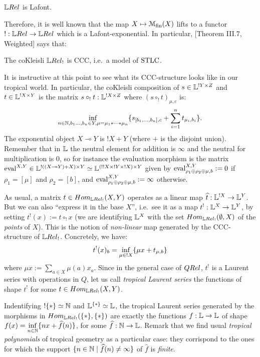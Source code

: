 \begin{fact}
 $\LREL$ is Lafont.
\end{fact}

Therefore, it is well known that the map $X\mapsto \mathcal{M}_{\mathrm{fin}}(X)$ lifts to a functor $!:\LREL\to\LREL$ which %
is a Lafont-exponential.
In particular, [Theorem III.7, Weighted] says that:
\begin{fact}
 The coKleisli $\LREL_!$ is CCC, i.e.\ a model of $\mathrm{STLC}$.
\end{fact}

It is instructive at this point to see what its CCC-structure looks like in our tropical world.
In particular, the coKleisli composition of $s\in\mathbb{L}^{!Y\times Z}$ and $t\in\mathbb{L}^{!X\times Y}$ is the matrix $s\circ_! t:\mathbb{L}^{!X\times Z}$ where $(s\circ_! t)_{\mu,c}$ is:
\[
 \inf\limits_{n\in\mathbb{N}, b_1\dots,b_n\in Y, \mu = \mu_1*\cdots *\mu_n}
 \{s_{[b_1,\dots,b_n],c} + \sum\limits_{i=1}^n t_{\mu_i,b_i}\}.
\]
The exponential object $X\multimap Y$ is $!X+Y$ (where $+$ is the disjoint union).
Remember that in $\mathbb{L}$ the neutral element for addition is $\infty$ and the neutral for multiplication is $0$, so for instance the evaluation morphism is the matrix $\mathrm{eval}^{X,Y}\in\mathbb{L}^{!((X\multimap Y) + X)\times Y}\simeq\mathbb{L}^{(!!X\times !Y\times !X)\times Y}$ given by $\mathrm{eval}^{X,Y}_{\rho_1\oplus\rho_2\oplus\mu,b}:=0$ if $\rho_1=[\mu]$ and $\rho_2=[b]$, and $\mathrm{eval}^{X,Y}_{\rho_1\oplus\rho_2\oplus\mu,b}:=\infty$ otherwise.

\begin{remark}
 As usual, a matrix $t\in\HOM{\LREL_!}{X}{Y}$ operates as a linear map $\widehat t:\mathbb{L}^{!X}\to\mathbb{L}^Y$.
 But we can also ``express it in the base $X$'', i.e.\ see it as a map $t^!:\mathbb{L}^X\to\mathbb{L}^Y$, by setting $t^!(x):=t\circ_! x$ (we are identifying $\mathbb{L}^X$ with the set $\HOM{\LREL_!}{\emptyset}{X}$ of the \emph{points} of $X$).
 This is the notion of \emph{non-linear} map generated by the CCC-structure of $\LREL_!$.
 Concretely, we have:
 \[t^!(x)_b=\inf\limits_{\mu\in !X} \{\mu x+ t_{\mu,b}\}\] where $\mu x:=\sum\limits_{a\in X} \mu(a)x_a$.
 Since in the general case of $\QREL$, $t^!$ is a Laurent series with operations in $Q$, let us call \emph{tropical Laurent series} the functions of shape $t^!$ for some $t\in\HOM{\LREL_!}{X}{Y}$.
\end{remark}

\begin{remark}
 Indentifying $!\{*\}\simeq \mathbb{N}$ and $\mathbb{L}^{\{*\}}\simeq\mathbb{L}$, the tropical Laurent series generated by the morphisms in $\HOM{\LREL_!}{\set{*}}{\set{*}}$ are exactly the functions $f:\mathbb{L}\to\mathbb{L}$ of shape $f(x)=\inf\limits_{n\in\mathbb{N}}\{nx+\widehat f(n)\}$, for some $\widehat f:\mathbb{N}\to\mathbb{L}$.
Remark that we find usual \emph{tropical polynomials} of tropical geometry as a particular case: they corrispond to the ones for which the support $\{n\in\mathbb{N}\mid\widehat f(n)\neq\infty\}$ of $\widehat f$ is \emph{finite}.
\end{remark}

